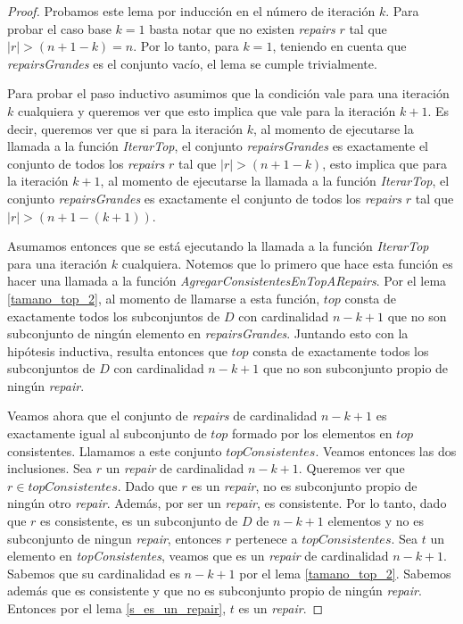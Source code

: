 \documentclass[11pt,a4paper,twoside]{tesis}
\begin{document}
\begin{proof}
Probamos este lema por inducción en el número de iteración $k$. Para probar el caso base $k=1$ basta notar que no existen \textit{repairs} $r$ tal que $|r| > (n + 1 - k) = n$. Por lo tanto, para $k=1$, teniendo en cuenta que \textit{repairsGrandes} es el conjunto vacío, el lema se cumple trivialmente.

Para probar el paso inductivo asumimos que la condición vale para una iteración $k$ cualquiera y queremos ver que esto implica que vale para la iteración $k+1$. Es decir, queremos ver que si para la iteración $k$, al momento de ejecutarse la llamada a la función \textit{IterarTop}, el conjunto \textit{repairsGrandes} es exactamente el conjunto de todos los \textit{repairs} $r$ tal que  $|r| > (n + 1 - k)$, esto implica que para la iteración $k+1$, al momento de ejecutarse la llamada a la función \textit{IterarTop}, el conjunto \textit{repairsGrandes} es exactamente el conjunto de todos los \textit{repairs} $r$ tal que  $|r| > (n + 1 - (k+1))$.


Asumamos entonces que se está ejecutando la llamada a la función \textit{IterarTop} para una iteración $k$ cualquiera. Notemos que lo primero que hace esta función es hacer una llamada a la función \textit{AgregarConsistentesEnTopARepairs}. Por el lema \ref{tamano_top_2}, al momento de llamarse a esta función, $top$ consta de exactamente todos los subconjuntos de $D$ con cardinalidad $n - k + 1$ que no son subconjunto de ningún elemento en \textit{repairsGrandes}. Juntando esto con la hipótesis inductiva, resulta entonces que $top$ consta de exactamente todos los subconjuntos de $D$ con cardinalidad $n - k + 1$ que no son subconjunto propio de ningún \textit{repair}. 

Veamos ahora que el conjunto de \textit{repairs} de cardinalidad $n-k+1$ es exactamente igual al subconjunto de $top$ formado por los elementos en $top$ consistentes. Llamamos a este conjunto $topConsistentes$. Veamos entonces las dos inclusiones.
Sea $r$ un \textit{repair} de cardinalidad $n-k+1$. Queremos ver que $r \in topConsistentes$. Dado que $r$ es un \textit{repair}, no es subconjunto propio de ningún otro \textit{repair}. Además, por ser un \textit{repair}, es consistente. Por lo tanto, dado que $r$ es consistente, es un subconjunto de $D$ de $n-k+1$ elementos y no es subconjunto de ningun \textit{repair}, entonces $r$ pertenece a $topConsistentes$.
Sea $t$ un elemento en \textit{topConsistentes}, veamos que es un \textit{repair} de cardinalidad $n-k+1$. Sabemos que su cardinalidad es $n-k+1$ por el lema \ref{tamano_top_2}. Sabemos además que es consistente y que no es subconjunto propio de ningún \textit{repair}. Entonces por el lema \ref{s_es_un_repair}, $t$ es un \textit{repair}.


\end{proof}
\end{document}

